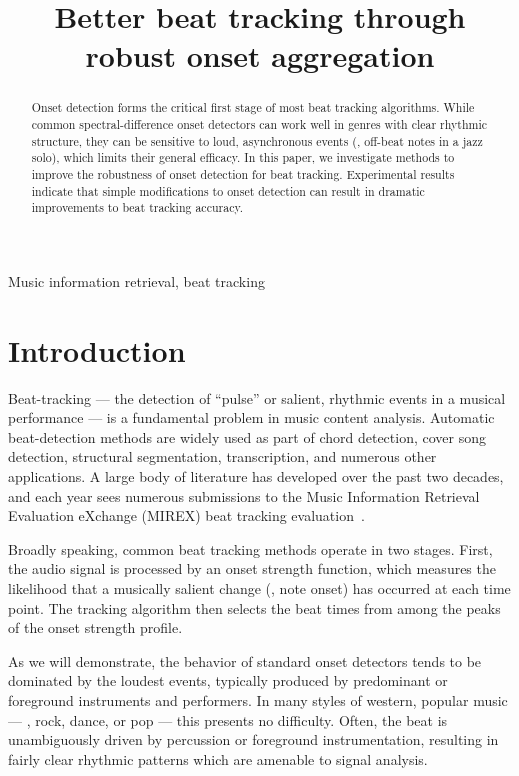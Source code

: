 \documentclass{article}
\title{Better beat tracking through robust onset aggregation}
\begin{document}
%
\maketitle
%
\begin{abstract}
Onset detection forms the critical first stage of most beat tracking algorithms.
While common spectral-difference onset detectors can work well in genres with clear 
rhythmic structure, they can be sensitive to loud, asynchronous events (\eg, off-beat 
notes in a jazz solo), which limits their general efficacy. In this paper, we investigate 
methods to improve the robustness of onset detection for beat tracking. 
Experimental results indicate that simple modifications to onset detection can result
in dramatic improvements to beat tracking accuracy.
\end{abstract}
%
\begin{keywords}
Music information retrieval, beat tracking
\end{keywords}
%
\section{Introduction}
\label{sec:intro}
Beat-tracking --- the detection of ``pulse'' or salient, rhythmic events in a musical 
performance --- is a fundamental problem in music content analysis. Automatic 
beat-detection methods are widely used as part of chord detection, cover song detection, 
structural segmentation, transcription, and numerous other applications. A large body of 
literature has developed over the past two decades, and each year sees numerous submissions 
to the Music Information Retrieval Evaluation eXchange (MIREX) beat tracking 
evaluation~\cite{Downie2008}.

Broadly speaking, common beat tracking methods operate in two stages.  First, the 
audio signal is processed by an onset strength function, which measures the likelihood 
that a musically salient change (\eg, note onset) has occurred at each time point.  
The tracking algorithm then selects the beat times from among the peaks of the onset 
strength profile.

As we will demonstrate, the behavior of standard onset detectors tends to be dominated by 
the loudest events, typically produced by predominant or foreground instruments and 
performers.  In many styles of western, popular music --- \eg, rock, dance, or pop --- 
this presents no difficulty. Often, the beat is unambiguously driven by percussion or 
foreground instrumentation, resulting in fairly clear rhythmic patterns which are amenable 
to signal analysis. 
\end{document}
